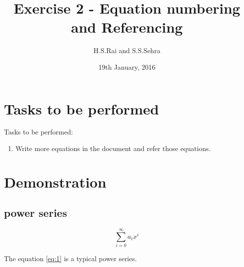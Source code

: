 \documentclass{article}
\title{Exercise 2 - Equation numbering and Referencing}
\author{H.S.Rai and S.S.Sehra}
\date{19th January, 2016}
\begin{document}
	\maketitle
		\section*{Tasks to be performed}
	Tasks to be performed:
	\begin{enumerate}
		\item Write more equations in the document and refer those equations.
	\end{enumerate}
\section*{Demonstration}

 
\subsection*{power series} 
 
\begin{equation} \label{eq:1}
\sum_{i=0}^{\infty} a_i x^i
\end{equation}
 
The equation \ref{eq:1} is a typical power series.
\end{document}
